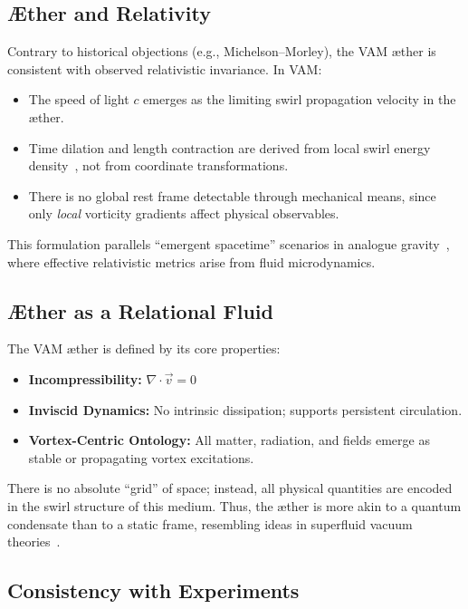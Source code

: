     \subsection{Æther and Relativity}

        Contrary to historical objections (e.g., Michelson--Morley), the VAM æther is consistent with observed relativistic invariance. In VAM:

        \begin{itemize}
            \item The speed of light $c$ emerges as the limiting swirl propagation velocity in the æther.
            \item Time dilation and length contraction are derived from local swirl energy density~\cite{iskandarani2025b}, not from coordinate transformations.
            \item There is no global rest frame detectable through mechanical means, since only \emph{local} vorticity gradients affect physical observables.
        \end{itemize}

        This formulation parallels “emergent spacetime” scenarios in analogue gravity~\cite{barcelo2011}, where effective relativistic metrics arise from fluid microdynamics.

    \subsection{Æther as a Relational Fluid}

        The VAM æther is defined by its core properties:
        \begin{itemize}
            \item \textbf{Incompressibility:} $\nabla \cdot \vec{v} = 0$
            \item \textbf{Inviscid Dynamics:} No intrinsic dissipation; supports persistent circulation.
            \item \textbf{Vortex-Centric Ontology:} All matter, radiation, and fields emerge as stable or propagating vortex excitations.
        \end{itemize}

        There is no absolute “grid” of space; instead, all physical quantities are encoded in the swirl structure of this medium. Thus, the æther is more akin to a quantum condensate than to a static frame, resembling ideas in superfluid vacuum theories~\cite{volovik2003}.

    \subsection{Consistency with Experiments}

